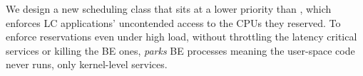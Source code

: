 We design a new scheduling class \beclass{} that sits at a lower priority than
\normalclass{}, which enforces LC applications' uncontended access to the CPUs
they reserved. To enforce reservations even under high load, without throttling
the latency critical services or killing the BE ones, \beclass{} \textit{parks}
BE processes meaning the user-space code never runs, only kernel-level
services.